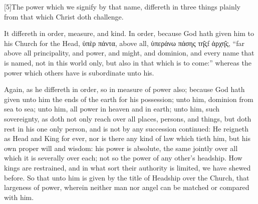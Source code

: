 [5]The power which we signify by that name, differeth in three things plainly from that which Christ doth challenge.

It differeth in order, measure, and kind. In order, because God hath given him to his Church for the Head, ὑπὲρ πάντα, above all, ὑπεράνω πάσης τη̑ςf ἀρχη̑ς, “far above all principality, and power, and might, and dominion, and every name that is named, not in this world only, but also in that which is to come:” whereas the power which others have is subordinate unto his.

Again, as he differeth in order, so in measure of power also; because God hath given unto him the ends of the earth for his possession; unto him, dominion from sea to sea; unto him, all power in heaven and in earth; unto him, such sovereignty, as doth not only reach over all places, persons, and things, but doth rest in his one only person, and is not by any succession continued: He reigneth as Head and King for ever, nor is there any kind of law which tieth him, but his own proper will and wisdom: his power is absolute, the same jointly over all which it is severally over each; not so the power of any other’s headship. How kings are restrained, and in what sort their authority is limited, we have shewed before. So that unto him is given by the title of Headship over the Church, that largeness of power, wherein neither man nor angel can be matched or compared with him.

